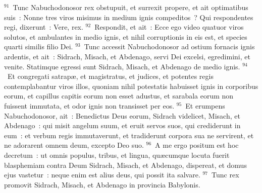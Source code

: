 ${}^{91}$~Tunc Nabuchodonosor rex obstupuit, et surrexit propere, et ait optimatibus suis~: Nonne tres viros misimus in medium ignis compeditos~? Qui respondentes regi, dixerunt~: Vere, rex.
${}^{92}$~Respondit, et ait~: Ecce ego video quatuor viros solutos, et ambulantes in medio ignis, et nihil corruptionis in eis est, et species quarti similis filio Dei.
${}^{93}$~Tunc accessit Nabuchodonosor ad ostium fornacis ignis ardentis, et ait~: Sidrach, Misach, et Abdenago, servi Dei excelsi, egredimini, et venite. Statimque egressi sunt Sidrach, Misach, et Abdenago de medio ignis.
${}^{94}$~Et congregati satrap\ae , et magistratus, et judices, et potentes regis contemplabantur viros illos, quoniam nihil potestatis habuisset ignis in corporibus eorum, et capillus capitis eorum non esset adustus, et sarabala eorum non fuissent immutata, et odor ignis non transisset per eos.
${}^{95}$~Et erumpens Nabuchodonosor, ait~: Benedictus Deus eorum, Sidrach videlicet, Misach, et Abdenago~: qui misit angelum suum, et eruit servos suos, qui crediderunt in eum~: et verbum regis immutaverunt, et tradiderunt corpora sua ne servirent, et ne adorarent omnem deum, excepto Deo suo.
${}^{96}$~A me ergo positum est hoc decretum~: ut omnis populus, tribus, et lingua, qu\ae cumque locuta fuerit blasphemiam contra Deum Sidrach, Misach, et Abdenago, dispereat, et domus ejus vastetur~: neque enim est alius deus, qui possit ita salvare.
${}^{97}$~Tunc rex promovit Sidrach, Misach, et Abdenago in provincia Babylonis.


